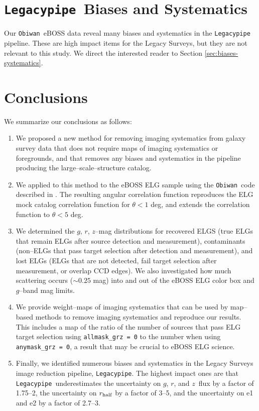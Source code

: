 \documentclass[a4paper,fleqn,usenatbib]{mnras}
\newcommand{\rhalf}{r_{\rm{half}}}
\newcommand{\gb}{$g$}
\newcommand{\rband}{$r$}
\newcommand{\zb}{$z$}
\newcommand{\legacypipe}{{\tt Legacypipe}}
\newcommand{\obiwan}{{\tt Obiwan}}
\begin{document}

\section{\legacypipe\, Biases and Systematics}

Our \obiwan\, eBOSS data reveal many biases and systematics in the \legacypipe\, pipeline. These are high impact items for the Legacy Surveys, but they are not relevant to this study. We direct the interested reader to Section \ref{sec:biases-systematics}. 


\section{Conclusions}
\label{sec:conclusions}

We summarize our conclusions as follows:
\begin{enumerate}
\item We proposed a new method for removing imaging systematics from galaxy survey data that does not  require maps of imaging systematics or foregrounds, and that removes any biases and systematics in the pipeline producing the large--scale--structure catalog.
\item We applied to this method to the eBOSS ELG sample using the \obiwan\, code described in \cite{obiwanMethods}. The resulting angular correlation function reproduces the ELG mock catalog correlation function \citep{corrfuncEboss} for $\theta < 1$ deg, and extends the correlation function to $\theta < 5$ deg.
\item We determined the \gb, \rband, \zb--mag distributions for recovered ELGS (true ELGs that remain ELGs after source detection and measurement), contaminants (non--ELGs that pass target selection after detection and measurement), and lost ELGs (ELGs that are not detected, fail target selection after measurement, or overlap CCD edges). We also investigated how much scattering occurs ($\sim 0.25$ mag) into and out of the eBOSS ELG color box and \gb--band mag limits. 
\item We provide weight--maps of imaging systematics that can be used by map--based methods to remove imaging systematics and reproduce our results. This includes a map of the ratio of the number of sources that pass ELG target selection using \verb|allmask_grz = 0| to the number when using \verb|anymask_grz = 0|, a result that may be crucial to eBOSS ELG science.
\item Finally, we identified numerous biases and systematics in the Legacy Surveys image reduction pipeline, \legacypipe. The highest impact ones are that \legacypipe\, underestimates the uncertainty on \gb, \rband, and \zb\, flux by a factor of 1.75--2, the uncertainty on $\rhalf$ by a factor of 3--5, and the uncertainty on e1 and e2 by a factor of 2.7--3. 
\end{enumerate}
\end{document}

